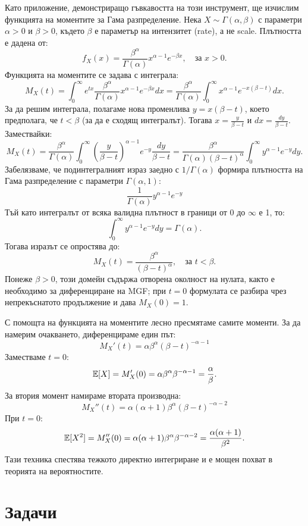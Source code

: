 Като приложение, демонстриращо гъвкавостта на този инструмент, ще изчислим функцията на моментите за Гама разпределение. Нека $X \sim \Gamma(\alpha, \beta)$ с параметри $\alpha>0$ и $\beta>0$, където $\beta$ е параметър на интензитет (rate), а не scale. Плътността е дадена от:
\[ f_X(x) = \frac{\beta^\alpha}{\Gamma(\alpha)} x^{\alpha-1} e^{-\beta x}, \quad \text{за } x > 0. \]
Функцията на моментите се задава с интеграла:
\[ M_X(t) = \int_0^\infty e^{tx} \frac{\beta^\alpha}{\Gamma(\alpha)} x^{\alpha-1} e^{-\beta x} dx = \frac{\beta^\alpha}{\Gamma(\alpha)} \int_0^\infty x^{\alpha-1} e^{-x(\beta-t)} dx. \]
За да решим интеграла, полагаме нова променлива $y = x(\beta-t)$, което предполага, че $t < \beta$ (за да е сходящ интегралът). Тогава $x = \frac{y}{\beta-t}$ и $dx = \frac{dy}{\beta-t}$. Замествайки:
\[ M_X(t) = \frac{\beta^\alpha}{\Gamma(\alpha)} \int_0^\infty \left( \frac{y}{\beta-t} \right)^{\alpha-1} e^{-y} \frac{dy}{\beta-t} = \frac{\beta^\alpha}{\Gamma(\alpha)(\beta-t)^\alpha} \int_0^\infty y^{\alpha-1} e^{-y} dy. \]
Забелязваме, че подинтегралният израз заедно с $1/\Gamma(\alpha)$ формира плътността на Гама разпределение с параметри $\Gamma(\alpha, 1)$:
\[ \frac{1}{\Gamma(\alpha)} y^{\alpha-1} e^{-y} \]
Тъй като интегралът от всяка валидна плътност в граници от $0$ до $\infty$ е 1, то:
\[ \int_0^\infty y^{\alpha-1} e^{-y} dy = \Gamma(\alpha). \]
Тогава изразът се опростява до:
\[ M_X(t) = \frac{\beta^\alpha}{(\beta-t)^\alpha}, \quad \text{за } t < \beta. \]
Понеже $\beta>0$, този домейн съдържа отворена околност на нулата, както е
необходимо за диференциране на MGF; при $t=0$ формулата се разбира чрез
непрекъснатото продължение и дава $M_X(0)=1$.

С помощта на функцията на моментите лесно пресмятаме самите моменти. За да намерим очакването, диференцираме един път:
\[ M_X'(t) = \alpha \beta^\alpha (\beta-t)^{-\alpha-1} \]
Заместваме $t=0$:
\[ \mathbb{E}[X] = M_X'(0) = \alpha \beta^\alpha \beta^{-\alpha-1} = \frac{\alpha}{\beta}. \]
За втория момент намираме втората производна:
\[ M_X''(t) = \alpha(\alpha+1) \beta^\alpha (\beta-t)^{-\alpha-2} \]
При $t=0$:
\[ \mathbb{E}[X^2] = M_X''(0) = \alpha(\alpha+1) \beta^\alpha \beta^{-\alpha-2} = \frac{\alpha(\alpha+1)}{\beta^2}. \]
Тази техника спестява тежкото директно интегриране и е мощен похват в теорията на вероятностите.

\section{Задачи}

